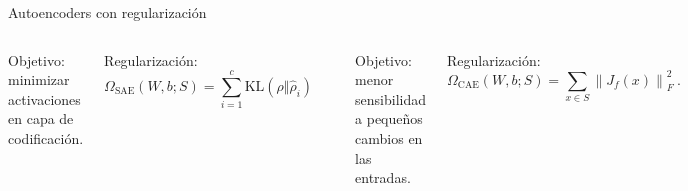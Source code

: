 \begin{frame}{Autoencoders con regularización}
\begin{columns}[t]

Objetivo: minimizar activaciones en capa de codificación.

Regularización: \[
  \Omega_{\mathrm{SAE}}(W,b;S)=\sum_{i=1}^c \mathrm{KL}(\rho\Vert \hat\rho_i)
\]

\begin{center}
\includegraphics[width=0.6\columnwidth]{../inffus/kldivergence.pdf} 
\end{center}



Objetivo: menor sensibilidad a pequeños cambios en las entradas.

Regularización:
\[
\Omega_{\mathrm{CAE}}(W,b;S) = \sum_{x\in S}\left\lVert J_f(x) \right\rVert_F^2~.
\]


\end{columns}
\end{frame}

